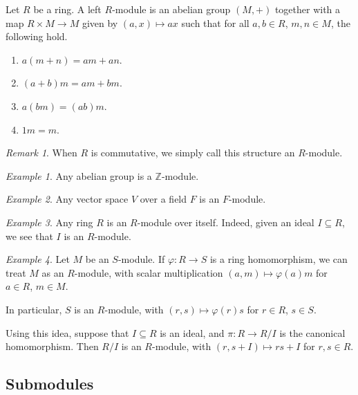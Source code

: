 \documentclass[11pt]{article}
\newcommand{\Z}{\mathbb{Z}}
\theoremstyle{definition}
\theoremstyle{remark}
\newtheorem*{remark}{Remark}
\newtheorem*{example}{Example}
\numberwithin{equation}{section}
\begin{document}
    \begin{definition}
        Let $R$ be a ring. A left $R$-module is an abelian group $(M, +)$ together
        with a map $R\times M \to M$ given by $(a, x) \mapsto ax$ such that for all
        $a, b \in R$, $m, n \in M$, the following hold. \begin{enumerate}
            \itemsep0em
            \item $a(m + n) = am + an$.
            \item $(a + b)m = am + bm$.
            \item $a(bm) = (ab)m$.
            \item $1m = m$.
        \end{enumerate}
        \begin{remark}
            When $R$ is commutative, we simply call this structure an $R$-module.
        \end{remark}
    \end{definition}
    \begin{example}
        Any abelian group is a $\Z$-module.
    \end{example}
    \begin{example}
        Any vector space $V$ over a field $F$ is an $F$-module.
    \end{example}
    \begin{example}
        Any ring $R$ is an $R$-module over itself.
        Indeed, given an ideal $I \subseteq R$, we see that $I$ is an $R$-module.
    \end{example}
    
    \begin{example}
        Let $M$ be an $S$-module. If $\varphi\colon R \to S$ is a ring homomorphism,
        we can treat $M$ as an $R$-module, with scalar multiplication $(a, m) \mapsto
        \varphi(a)m$ for $a \in R$, $m \in M$.

        In particular, $S$ is an $R$-module, with $(r, s) \mapsto \varphi(r)s$ for $r
        \in R$, $s \in S$.

        Using this idea, suppose that $I\subseteq R$ is an ideal, and $\pi\colon
        R \to R/I$ is the canonical homomorphism. Then $R/I$ is an $R$-module, with
        $(r, s + I) \mapsto rs + I$ for $r, s \in R$.
    \end{example}


    \subsection{Submodules}
    
\end{document}
